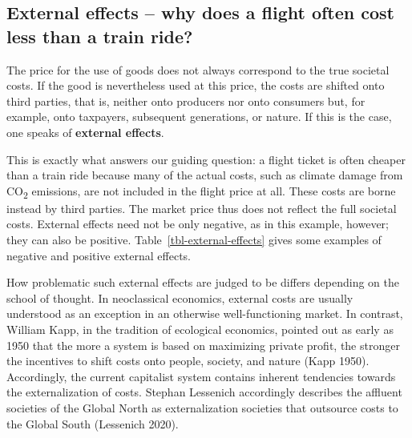 \documentclass[
  british,
  a4paper,
  DIV=11,
  numbers=noendperiod,
  oneside,
  openany]{scrreprt}
\begin{document}
\subsection{External effects -- why does a flight often cost less than a
train
ride?}\label{external-effects-why-does-a-flight-often-cost-less-than-a-train-ride}

The price for the use of goods does not always correspond to the true
societal costs. If the good is nevertheless used at this price, the
costs are shifted onto third parties, that is, neither onto producers
nor onto consumers but, for example, onto taxpayers, subsequent
generations, or nature. If this is the case, one speaks of
\textbf{external effects}.

This is exactly what answers our guiding question: a flight ticket is
often cheaper than a train ride because many of the actual costs, such
as climate damage from CO\textsubscript{2} emissions, are not included
in the flight price at all. These costs are borne instead by third
parties. The market price thus does not reflect the full societal costs.
External effects need not be only negative, as in this example, however;
they can also be positive. Table~\ref{tbl-external-effects} gives some
examples of negative and positive external effects.

How problematic such external effects are judged to be differs depending
on the school of thought. In neoclassical economics, external costs are
usually understood as an exception in an otherwise well-functioning
market. In contrast, William Kapp, in the tradition of ecological
economics, pointed out as early as 1950 that the more a system is based
on maximizing private profit, the stronger the incentives to shift costs
onto people, society, and nature (Kapp 1950). Accordingly, the current
capitalist system contains inherent tendencies towards the
externalization of costs. Stephan Lessenich accordingly describes the
affluent societies of the Global North as externalization societies that
outsource costs to the Global South (Lessenich 2020).
\end{document}
